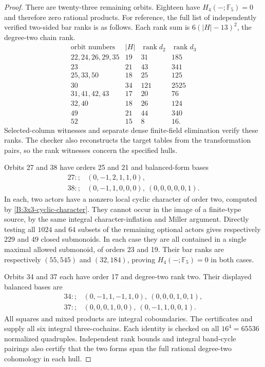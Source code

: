 \begin{proof}
There are twenty-three remaining orbits.  Eighteen have
$H_4(-;\mathbb F_5)=0$ and therefore zero rational products.
For reference, the full list of independently verified two-sided
bar ranks is as follows.  Each rank sum is
$6(|H|-13)^2$, the degree-two chain rank.
\[
\begin{array}{l|r|r|r}
\text{orbit numbers}&|H|&\operatorname{rank}d_2&\operatorname{rank}d_3\\\hline
22,24,26,29,35&19&31&185\\
23&21&43&341\\
25,33,50&18&25&125\\
30&34&121&2525\\
31,41,42,43&17&20&76\\
32,40&18&26&124\\
49&21&44&340\\
52&15&8&16.
\end{array}
\]
Selected-column witnesses and separate dense finite-field elimination
verify these ranks.  The checker also reconstructs the target tables
from the transformation pairs, so the rank witnesses concern the
specified hulls.

Orbits 27 and 38 have orders 25 and 21 and balanced-form bases
\[
\begin{split}
27:;&(0,-1,2,1,1,0),\\
38:;&(0,-1,1,0,0,0),\ (0,0,0,0,0,1).
\end{split}
\]
In each, two actors have a nonzero local cyclic character of order
two, computed by \eqref{B:3x3-cyclic-character}.  They cannot occur
in the image of a finite-type source, by the same integral
character-inflation and Miller argument.  Directly testing all
$1024$ and $64$ subsets of the remaining optional actors gives
respectively $229$ and $49$ closed submonoids.  In each case they
are all contained in a single maximal allowed submonoid, of orders
23 and 19.  Their bar ranks are respectively $(55,545)$ and
$(32,184)$, proving $H_4(-;\mathbb F_5)=0$ in both cases.

Orbits 34 and 37 each have order 17 and degree-two rank two.
Their displayed balanced bases are
\[
\begin{split}
34:;&(0,-1,1,-1,1,0),\ (0,0,0,1,0,1),\\
37:;&(0,0,0,1,0,0),\ (0,-1,1,0,0,1).
\end{split}
\]
All squares and mixed products are integral coboundaries.
The certificates
 and
supply all six integral three-cochains.  Each identity is checked on
all $16^4=65536$ normalized quadruples.  Independent rank bounds and
integral band-cycle pairings also certify that the two forms span
the full rational degree-two cohomology in each hull.


\end{proof}
